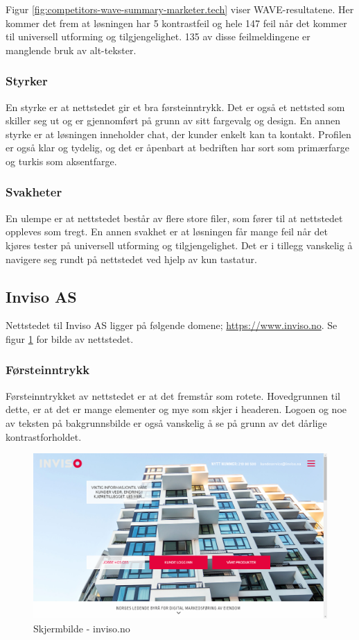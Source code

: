 Figur \ref{fig:competitors-wave-summary-marketer.tech} viser WAVE-resultatene. Her kommer det frem at løsningen har 5 kontrastfeil og hele 147 feil når det kommer til universell utforming og tilgjengelighet. 135 av disse feilmeldingene er manglende bruk av alt-tekster.

\subsubsection{Styrker}
En styrke er at nettstedet gir et bra førsteinntrykk. Det er også et nettsted som skiller seg ut og er gjennomført på grunn av sitt fargevalg og design. En annen styrke er at løsningen inneholder chat, der kunder enkelt kan ta kontakt. Profilen er også klar og tydelig, og det er åpenbart at bedriften har sort som primærfarge og turkis som aksentfarge.

\subsubsection{Svakheter}
En ulempe er at nettstedet består av flere store filer, som fører til at nettstedet oppleves som tregt. En annen svakhet er at løsningen får mange feil når det kjøres tester på universell utforming og tilgjengelighet. Det er i tillegg vanskelig å navigere seg rundt på nettstedet ved hjelp av kun tastatur.

\subsection{Inviso AS}
Nettstedet til Inviso AS ligger på følgende domene;
\url{https://www.inviso.no}. Se figur \ref{fig:competitors-inviso.no} for bilde av nettstedet.

\subsubsection{Førsteinntrykk}
Førsteinntrykket av nettstedet er at det fremstår som rotete. Hovedgrunnen til dette, er at det er mange elementer og mye som skjer i headeren. Logoen og noe av teksten på bakgrunnsbilde er også vanskelig å se på grunn av det dårlige kontrastforholdet. 

\begin{figure}[H]
    \centering
    \includegraphics[width=\textwidth]{line/inviso_no_(1366x768).png}
    \caption{Skjermbilde - inviso.no}
    \label{fig:competitors-inviso.no}
\end{figure}


